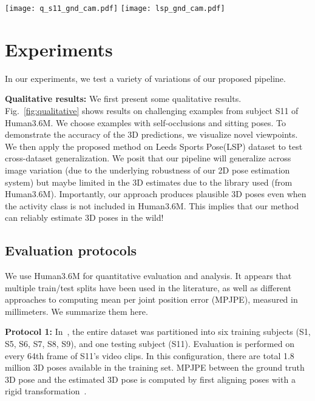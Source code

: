 \documentclass[10pt,twocolumn,letterpaper]{article}
\begin{document}
\begin{figure*}[t!]
\texttt{[image: q\_s11\_gnd\_cam.pdf]}
\texttt{[image: lsp\_gnd\_cam.pdf]}
   \caption{We show qualitative results on Human3.6M-test ({\bf top}) and LSP-test ({\bf bottom}). Our method produces plausible results for challenging images with self-occlusions and extreme poses, and can generalize to activities and poses not in the train set (Human3.6M-train).}
\label{fig:qualitative}
\end{figure*}

\section{Experiments} \label{exp}
In our experiments, we test a variety of variations of our proposed pipeline.

{\bf Qualitative results:} We first present
 some qualitative results. Fig.~\ref{fig:qualitative} shows results on challenging examples from subject S11 of Human3.6M. We choose examples with self-occlusions and sitting poses. To demonstrate the accuracy of the 3D predictions, we visualize novel viewpoints. We then apply the proposed method on Leeds Sports Pose(LSP) dataset \cite{Johnson10} to test cross-dataset generalization.
We posit that our pipeline will generalize across image variation (due to the underlying robustness of our 2D pose estimation system) but maybe limited in the 3D estimates due to the library used (from Human3.6M).
Importantly, our approach produces plausible 3D poses even when the activity class is not included in Human3.6M. This implies that our method can reliably estimate 3D poses in the wild!





\subsection{Evaluation protocols}
We use Human3.6M for quantitative evaluation and analysis. It appears that multiple train/test splits have been used in the literature, as well as different approaches to computing mean per joint position error (MPJPE), measured in millimeters. We summarize them here.

\textbf{Protocol 1:} In~\cite{Yasin_2016_CVPR,kostrikov2014depth,rogez2016mocap}, the entire dataset was partitioned into six training subjects (S1, S5, S6, S7, S8, S9), and one testing subject (S11). Evaluation is performed on every 64th frame of S11's video clips. In this configuration, there are total 1.8 million 3D poses available in the training set. MPJPE between the ground truth 3D pose and the estimated 3D pose is computed by first aligning poses with a rigid transformation~\cite{kostrikov2014depth}.
\end{document}
